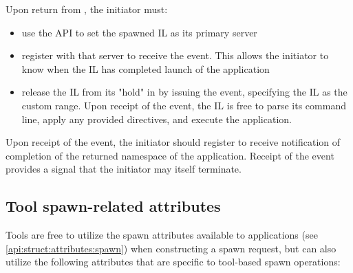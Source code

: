 Upon return from , the initiator must:

\begin{itemize}
    \item use the  \ac{API} to set the spawned \ac{IL} as its primary server
    \item register with that server to receive the  event. This allows the initiator to know when the \ac{IL} has completed launch of the application
    \item release the \ac{IL} from its "hold" in  by issuing the  event, specifying the \ac{IL} as the custom range. Upon receipt of the event, the \ac{IL} is free to parse its command line, apply any provided directives, and execute the application.
\end{itemize}

Upon receipt of the  event, the initiator should register to receive notification of completion of the returned namespace of the application. Receipt of the  event provides a signal that the initiator may itself terminate.


\subsection{Tool spawn-related attributes}
\label{api:tools:attributes:spawn}

Tools are free to utilize the spawn attributes available to applications (see \ref{api:struct:attributes:spawn}) when constructing a spawn request, but can also utilize the following attributes that are specific to tool-based spawn operations:

